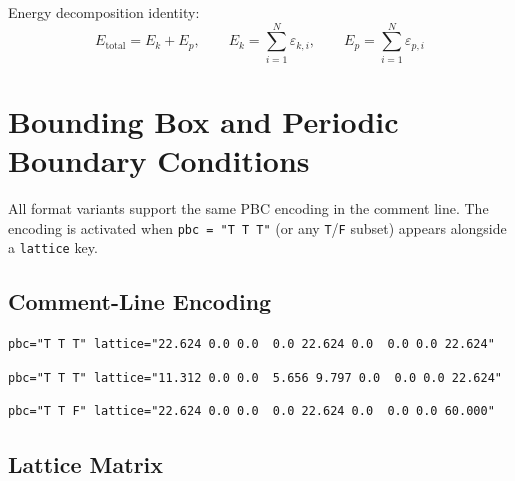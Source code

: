 \documentclass[11pt, a4paper, oneside]{article}
\begin{document}
Energy decomposition identity:
\begin{equation}
  E_{\mathrm{total}} = E_k + E_p,
  \qquad
  E_k = \sum_{i=1}^{N} \varepsilon_{k,i},
  \qquad
  E_p = \sum_{i=1}^{N} \varepsilon_{p,i}
  \label{eq:energy_decomp}
\end{equation}

\section{Bounding Box and Periodic Boundary Conditions}
\label{sec:pbc}

All format variants support the same PBC encoding in the comment line.
The encoding is activated when \texttt{pbc = "T T T"} (or any
\texttt{T}/\texttt{F} subset) appears alongside a \texttt{lattice} key.

\subsection{Comment-Line Encoding}
\label{sec:pbc_encoding}

\begin{lstlisting}[caption={Orthorhombic box.}]
pbc="T T T" lattice="22.624 0.0 0.0  0.0 22.624 0.0  0.0 0.0 22.624"
\end{lstlisting}

\begin{lstlisting}[caption={Triclinic box (monoclinic example).}]
pbc="T T T" lattice="11.312 0.0 0.0  5.656 9.797 0.0  0.0 0.0 22.624"
\end{lstlisting}

\begin{lstlisting}[caption={Slab geometry (periodic in x,y only).}]
pbc="T T F" lattice="22.624 0.0 0.0  0.0 22.624 0.0  0.0 0.0 60.000"
\end{lstlisting}

\subsection{Lattice Matrix}
\label{sec:pbc_vectors}
\end{document}
